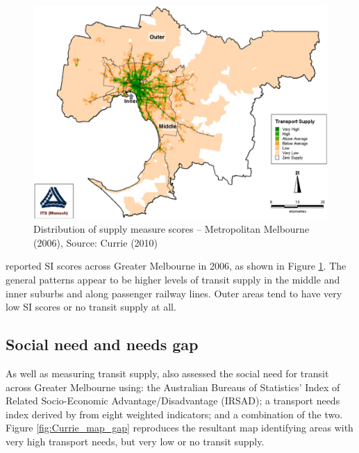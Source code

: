 \documentclass[preprint, 3p,
authoryear]{elsarticle} %
\begin{document}
\begin{figure}
\includegraphics[width=1\linewidth]{graphics/Currie2010SI} \caption{Distribution of supply measure scores – Metropolitan Melbourne (2006), Source: Currie (2010)}\label{fig:Currie_map_SI}
\end{figure}

\citet{currie2010identifying} reported SI scores across Greater
Melbourne in 2006, as shown in Figure \ref{fig:Currie_map_SI}. The
general patterns appear to be higher levels of transit supply in the
middle and inner suburbs and along passenger railway lines. Outer areas
tend to have very low SI scores or no transit supply at all.

\hypertarget{social-need-and-needs-gap}{%
\subsection{Social need and needs gap}\label{social-need-and-needs-gap}}

As well as measuring transit supply, \citet{currie2010identifying} also
assessed the social need for transit across Greater Melbourne using: the
Australian Bureaus of Statistics' Index of Related Socio-Economic
Advantage/Disadvantage (IRSAD); a transport needs index derived by
\citet{currie2010identifying} from eight weighted indicators; and a
combination of the two. Figure \ref{fig:Currie_map_gap} reproduces the
resultant map identifying areas with very high transport needs, but very
low or no transit supply.
\end{document}
